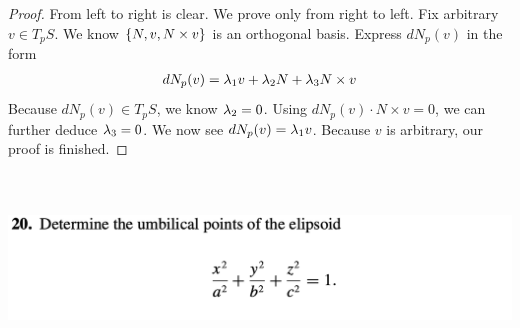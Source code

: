 \documentclass{report}
\begin{document}
\begin{proof}

From left to right is clear. We prove only from right to left. Fix arbitrary $v\in T_pS$. We know $\{ N,v,N\times v \}$ is an orthogonal basis. Express $dN_p(v)$ in the form 
\begin{align*}
dN_p(v)=\lambda_1 v+ \lambda_2 N + \lambda_3 N \times v 
\end{align*}
Because $dN_p(v)\in T_pS$, we know $\lambda _2=0$. Using $dN_p(v)\cdot N \times v=0$, we can further deduce $\lambda_3 =0$. We now see $dN_p(v)=\lambda _1 v$. Because $v$ is arbitrary, our proof is finished.  
\end{proof}
\begin{question}{}{}
\includegraphics[height=5cm,width=18cm]{hw5q10}
\end{question}
\end{document}
